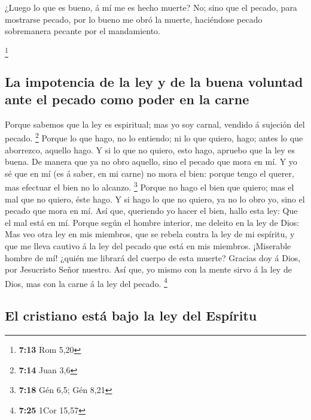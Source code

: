  ¿Luego lo que es bueno, á mí me es hecho muerte? No;
sino que el pecado, para mostrarse pecado, por lo bueno me obró la
muerte, haciéndose pecado sobremanera pecante por el mandamiento.

\footnote{\textbf{7:13} Rom 5,20}

\hypertarget{la-impotencia-de-la-ley-y-de-la-buena-voluntad-ante-el-pecado-como-poder-en-la-carne}{%
\subsection{La impotencia de la ley y de la buena voluntad ante el
pecado como poder en la
carne}\label{la-impotencia-de-la-ley-y-de-la-buena-voluntad-ante-el-pecado-como-poder-en-la-carne}}

 Porque sabemos que la ley es espiritual; mas yo soy
carnal, vendido á sujeción del pecado. \footnote{\textbf{7:14} Juan 3,6}
 Porque lo que hago, no lo entiendo; ni lo que quiero,
hago; antes lo que aborrezco, aquello hago.  Y si lo que
no quiero, esto hago, apruebo que la ley es buena.  De
manera que ya no obro aquello, sino el pecado que mora en mí.
 Y yo sé que en mí (es á saber, en mi carne) no mora el
bien: porque tengo el querer, mas efectuar el bien no lo alcanzo.
\footnote{\textbf{7:18} Gén 6,5; Gén 8,21}  Porque no
hago el bien que quiero; mas el mal que no quiero, éste hago.
 Y si hago lo que no quiero, ya no lo obro yo, sino el
pecado que mora en mí.  Así que, queriendo yo hacer el
bien, hallo esta ley: Que el mal está en mí.  Porque
según el hombre interior, me deleito en la ley de Dios: 
Mas veo otra ley en mis miembros, que se rebela contra la ley de mi
espíritu, y que me lleva cautivo á la ley del pecado que está en mis
miembros.  ¡Miserable hombre de mí! ¿quién me librará del
cuerpo de esta muerte?  Gracias doy á Dios, por
Jesucristo Señor nuestro. Así que, yo mismo con la mente sirvo á la ley
de Dios, mas con la carne á la ley del pecado. \footnote{\textbf{7:25}
  1Cor 15,57}

\hypertarget{el-cristiano-estuxe1-bajo-la-ley-del-espuxedritu}{%
\subsection{El cristiano está bajo la ley del
Espíritu}\label{el-cristiano-estuxe1-bajo-la-ley-del-espuxedritu}}

